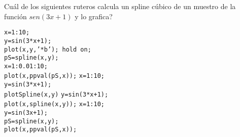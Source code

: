 \begin{pregunta}
\begin{cuerpo}
\textquestiondown Cu\'al de los siguientes ruteros calcula un spline c\'ubico de un muestro de la funci\'on $sen(3x+1)$ y lo grafica?
\end{cuerpo}

\begin{multicols}{2}
\begin{alternativas}
{
\texttt{x=1:10;}	\\
\texttt{y=sin(3*x+1);}\\
\texttt{plot(x,y,'*b'); hold on;}\\
\texttt{pS=spline(x,y);}\\
\texttt{x=1:0.01:10;}\\
\texttt{plot(x,ppval(pS,x));}	}
{
\texttt{x=1:10;}	\\
\texttt{y=sin(3*x+1);}\\
\texttt{plotSpline(x,y)}	}
{
\texttt{y=sin(3*x+1);}\\
\texttt{plot(x,spline(x,y));}	}
{
\texttt{x=1:10;}	\\
\texttt{y=sin(3x+1);}\\
\texttt{pS=spline(x,y);}\\
\texttt{plot(x,ppval(pS,x));}	}
\end{alternativas}
\end{multicols}
\justificacion{0cm}
\end{pregunta}
